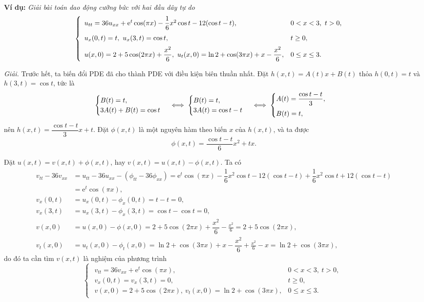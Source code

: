 \documentclass[10pt, a4paper]{article}
\begin{document}
	\textbf{Ví dụ:} \textit{Giải bài toán dao động cưỡng bức với hai đầu dây tự do} $$\begin{cases}
		\begin{array}{ll}
			u_{tt}=36u_{xx}+\mathrm e^t\cos(\pi x)-\dfrac16x^2\cos t-12(\cos t-t), & 0<x<3,~t>0,\\
			\noalign{\vskip5pt}
			u_x(0,t)=t,~u_x(3,t)=\cos t, & t\ge0,\\
			\noalign{\vskip5pt}
			u(x,0)=2+5\cos(2\pi x)+\dfrac{x^2}
			{6},~u_t(x,0)=\ln2+\cos(3\pi x)+x-\dfrac{x^2}{6}, & 0\le x\le 3.
		\end{array}
	\end{cases}$$
	
	\textit{Giải.} Trước hết, ta biến đổi PDE đã cho thành PDE với điều kiện biên thuần nhất. Đặt $h(x,t)=A(t)x+B(t)$ thỏa $h(0,t)=t$ và $h(3,t)=\cos t$, tức là $$\begin{cases}
		B(t)=t,\\
		3A(t)+B(t)=\cos t
	\end{cases}\iff\begin{cases}
		B(t)=t,\\
		3A(t)=\cos t-t
	\end{cases}\iff\begin{cases}
		A(t)=\dfrac{\cos t-t}{3},\\
		\noalign{\vskip5pt}
		B(t)=t,
	\end{cases}$$
	nên $h(x,t)=\dfrac{\cos t-t}{3}x+t$. Đặt $\phi(x,t)$ là một nguyên hàm theo biến $x$ của $h(x,t)$, và ta được $$\phi(x,t)=\frac{\cos t-t}{6}x^2+tx.$$
	
	Đặt $u(x,t)=v(x,t)+\phi(x,t)$, hay $v(x,t)=u(x,t)-\phi(x,t)$. Ta có \begin{align*}
		v_{tt}-36v_{xx}&=u_{tt}-36u_{xx}-(\phi_{tt}-36\phi_{xx})=\mathrm e^t\cos(\pi x)-\dfrac16x^2\cos t-12(\cos t-t)+\dfrac16x^2\cos t+12(\cos t-t)\\
		&=\mathrm e^t\cos(\pi x),\\
		v_x(0,t)&=u_x(0,t)-\phi_x(0,t)=t-t=0,\\
		v_x(3,t)&=u_x(3,t)-\phi_x(3,t)=\cos t-\cos t=0,\\
		v(x,0)&=u(x,0)-\phi(x,0)=2+5\cos(2\pi x)+\dfrac{x^2}{6}-\frac{x^2}{6}=2+5\cos(2\pi x),\\
		v_t(x,0)&=u_t(x,0)-\phi_t(x,0)=\ln2+\cos(3\pi x)+x-\dfrac{x^2}{6}+\frac{x^2}{6}-x=\ln2+\cos(3\pi x),
	\end{align*}
	do đó ta cần tìm $v(x,t)$ là nghiệm của phương trình $$\begin{cases}
		\begin{array}{ll}
			v_{tt}=36v_{xx}+\mathrm e^t\cos(\pi x), & 0<x<3,~t>0,\\
			v_x(0,t)=v_x(3,t)=0, & t\ge0,\\
			v(x,0)=2+5\cos(2\pi x),~v_t(x,0)=\ln2+\cos(3\pi x), & 0\le x\le 3.
		\end{array}
	\end{cases}$$
	
\end{document}
